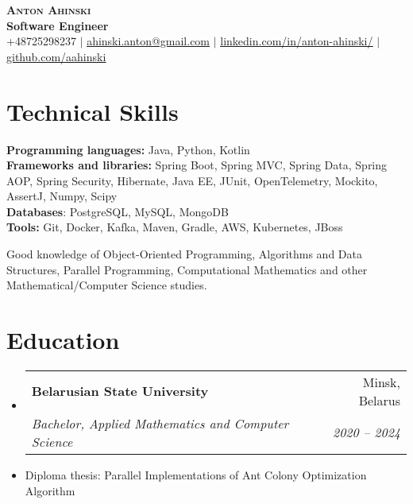 \documentclass[letterpaper,11pt]{article}
\makeatletter
\newcommand{\resumeItem}[1]{
  \item{
    {#1 \vspace{-2pt}}
  }
}
\newcommand{\resumeSubheading}[4]{
  \vspace{-2pt}\item
    \begin{tabular*}{0.97\textwidth}[t]{l@{\extracolsep{\fill}}r}
      \textbf{#1} & #2 \\
      \textit{#3} & \textit{ #4} \\
    \end{tabular*}\vspace{-7pt}
}
\newcommand{\resumeSubHeadingListStart}{\begin{itemize}[leftmargin=0.15in, label={}]}
\newcommand{\resumeSubHeadingListEnd}{\end{itemize}}
\makeatother
\begin{document}
\begin{center}
    \textbf{\Huge \scshape Anton Ahinski} \\
    \vspace{0.25cm}
    \textbf{\Large Software Engineer} \\
    \vspace{10pt}
     +48725298237 $|$ \href{mailto:x@x.com}{\underline{ahinski.anton@gmail.com}} $|$ \href{https://www.linkedin.com/in/anton-ahinski/}{\underline{linkedin.com/in/anton-ahinski/}} $|$ \href{https://www.github.com/aahinski}{\underline{github.com/aahinski}}
\end{center}

%
\section{Technical Skills}
 \begin{itemize}[leftmargin=0.15in, label={}]
    {\item{
     \textbf{Programming languages:} Java, Python, Kotlin \\
     \textbf{Frameworks and libraries:} Spring Boot, Spring MVC, Spring Data, Spring AOP, Spring Security, Hibernate, Java EE, JUnit, OpenTelemetry, Mockito, AssertJ, Numpy, Scipy \\
     \textbf{Databases}: PostgreSQL, MySQL, MongoDB \\
      \textbf{Tools:} Git, Docker, Kafka, Maven, Gradle, AWS, Kubernetes, JBoss \\

      \resumeItem{Good knowledge of Object-Oriented Programming, Algorithms and Data Structures, Parallel Programming, Computational Mathematics and other Mathematical/Computer Science studies.}
    }}
 \end{itemize}

\section{Education}
  \resumeSubHeadingListStart
    \resumeSubheading
      {Belarusian State University}{Minsk, Belarus}
      {Bachelor, Applied Mathematics and Computer Science}{2020 -- 2024}
      \resumeItem{Diploma thesis: Parallel Implementations of Ant Colony Optimization Algorithm}
  \resumeSubHeadingListEnd
\end{document}
